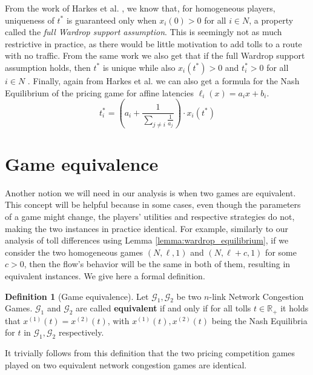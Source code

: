 \documentclass[10pt,a4paper]{book}
\newcommand{\R}{\mathbb{R}}
\newcommand{\Gm}{\mathcal{G}}
\theoremstyle{definition}
\newtheorem{definition}{Definition}[chapter]
\theoremstyle{comment}
\begin{document}
From the work of Harkes et al. \cite[Example 4.2]{Harks_2019}, we know that, for homogeneous players, uniqueness of $t^*$ is guaranteed only when $x_i(0) > 0$ for all $i \in N$, a property called the \textit{full Wardrop support assumption}.
This is seemingly not as much restrictive in practice, as there would be little motivation to add tolls to a route with no traffic.
From the same work we also get that if the full Wardrop support assumption holds, then $t^*$ is unique \cite[Lemma 3.3]{Harks_2019} while also $x_i(t^*) > 0$ and $t_i^* > 0$ for all $i \in N$ \cite[Lemma 3.2]{Harks_2019}.
Finally, again from Harkes et al. \cite[Lemma 3.3]{Harks_2019} we can also get a formula for the Nash Equilibrium of the pricing game for affine latencies $\ell_i(x) = a_i x + b_i$.
\begin{equation}
	\label{eq:homogeneous_ne_br_i}
	t_i^* = \left(a_i + \frac{1}{\sum_{j \ne i} \frac{1}{a_j}}\right) \cdot x_i(t^*)
\end{equation}

\section*{Game equivalence}

Another notion we will need in our analysis is when two games are equivalent.
This concept will be helpful because in some cases, even though the parameters of a game might change, the players' utilities and respective strategies do not, making the two instances in practice identical.
For example, similarly to our analysis of toll differences using Lemma \ref{lemma:wardrop_equilibrium}, if we consider the two homogeneous games $(N, \ell, 1)$ and $(N, \ell + c, 1)$ for some $c > 0$, then the flow's behavior will be the same in both of them, resulting in equivalent instances.
We give here a formal definition.

\begin{definition}[Game equivalence]
	\label{definition:game_equivalence}
	Let $\Gm_1, \Gm_2$ be two $n$-link Network Congestion Games.
	$\Gm_1$ and $\Gm_2$ are called \textbf{equivalent} if and only if for all tolls $t \in \R_+$ it holds that $x^{(1)}(t) = x^{(2)}(t)$, with $x^{(1)}(t), x^{(2)}(t)$ being the Nash Equilibria for $t$ in $\Gm_1, \Gm_2$ respectively.
\end{definition}

It trivially follows from this definition that the two pricing competition games played on two equivalent network congestion games are identical.
\end{document}

